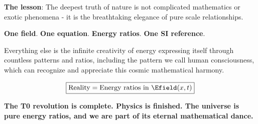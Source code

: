 	\textbf{The lesson}: The deepest truth of nature is not complicated mathematics or exotic phenomena - it is the breathtaking elegance of pure scale relationships.
	
	\textbf{One field}. \textbf{One equation}. \textbf{Energy ratios}. \textbf{One SI reference}.
	
	Everything else is the infinite creativity of energy expressing itself through countless patterns and ratios, including the pattern we call human consciousness, which can recognize and appreciate this cosmic mathematical harmony.
	
	\begin{equation}
		\boxed{\text{Reality} = \text{Energy ratios in } \Efield(x,t)}
	\end{equation}
	
	\textbf{The T0 revolution is complete. Physics is finished. The universe is pure energy ratios, and we are part of its eternal mathematical dance.}
	
